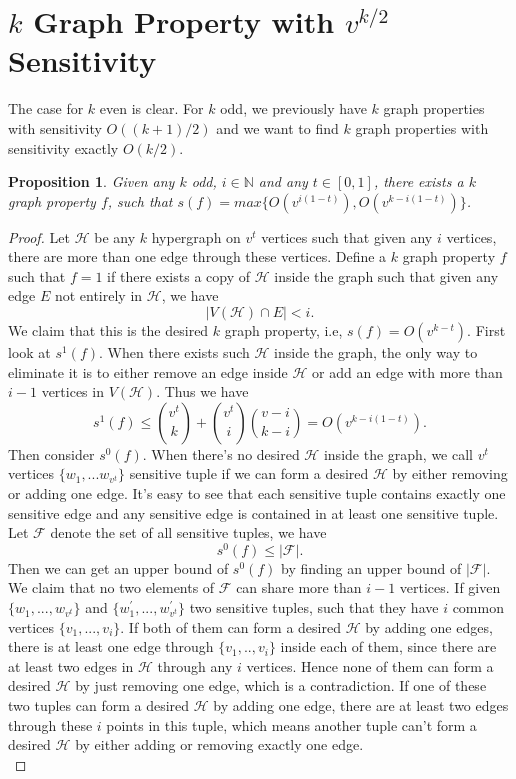 \documentclass[psamsfonts]{amsart}
\newtheorem{prop}[thm]{Proposition}
\theoremstyle{definition}
\theoremstyle{remark}
\numberwithin{equation}{section}
\begin{document}
	\section{$k$ Graph Property with $v^{k/2}$ Sensitivity}
	The case for $k$ even is clear. For $k$ odd, we previously have $k$ graph properties with sensitivity  $O((k+1)/2)$ and we want to find $k$ graph properties with sensitivity exactly $O(k/2)$.
	
	\begin{prop}
		Given any $k$ odd, $i \in \mathbb{N}$ and any $t \in [0,1]$, there exists a $k$ graph property $f$, such that $s(f) = max\{O(v^{i(1-t)}), O(v^{k-i(1-t)})\}$.
	\end{prop}
	\begin{proof}
		Let $\mathcal{H}$ be any $k$ hypergraph on $v^t$ vertices such that given any $i$ vertices, there are more than one edge through these vertices. Define a $k$ graph property $f$ such that $f=1$ if there exists a copy of $\mathcal{H}$ inside the graph such that given any edge $E$ not entirely in $\mathcal{H}$, we have
		\begin{equation}
			|V(\mathcal{H}) \cap E| < i.
		\end{equation}
		\indent We claim that this is the desired $k$ graph property, i.e, $s(f) = O(v^{k-t})$. First look at $s^1(f)$. When there exists such $\mathcal{H}$ inside the graph, the only way to eliminate it is to either remove an edge inside $\mathcal{H}$ or add an edge with more than $i-1$ vertices in $V(\mathcal{H})$. Thus we have
		\begin{equation}
			s^1(f) \leq {v^t \choose{k}} + {v^t \choose{i}}{v-i \choose{k-i}} = O(v^{k-i(1-t)}).
		\end{equation}
		Then consider $s^0(f)$. When there's no desired $\mathcal{H}$ inside the graph, we call $v^t$ vertices $\{w_1,...w_{v^t}\}$ sensitive tuple if we can form a desired $\mathcal{H}$ by either removing or adding one edge. It's easy to see that each sensitive tuple contains exactly one sensitive edge and any sensitive edge is contained in at least one sensitive tuple. Let $\mathcal{F}$ denote the set of all sensitive tuples, we have
		\begin{equation}
			s^0(f) \leq |\mathcal{F}|.
		\end{equation}
		Then we can get an upper bound of $s^0(f)$ by finding an upper bound of $|\mathcal{F}|$. We claim that no two elements of $\mathcal{F}$ can share more than $i-1$ vertices. If given $\{w_1,...,w_{v^t}\}$ and $\{w_1^\prime,...,w_{v^t}^\prime\}$ two sensitive tuples, such that they have $i$ common vertices $\{v_1,...,v_i\}$. If both of them can form a desired $\mathcal{H}$ by adding one edges, there is at least one edge through $\{v_1,..,v_i\}$ inside each of them, since there are at least two edges in $\mathcal{H}$ through any $i$ vertices. Hence none of them can form a desired $\mathcal{H}$ by just removing one edge, which is a contradiction. If one of these two tuples can form a desired $\mathcal{H}$ by adding one edge, there are at least two edges through these $i$ points in this tuple, which means another tuple can't form a desired $\mathcal{H}$ by either adding or removing exactly one edge.\\

\end{proof}
\end{document}
